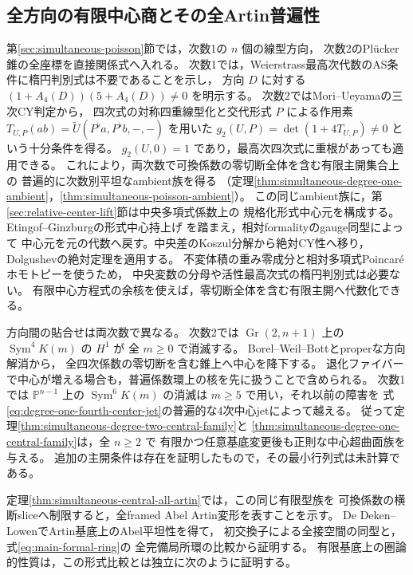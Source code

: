\documentclass[a4paper,11pt]{ltjsarticle}
\numberwithin{equation}{section}
\theoremstyle{plain}
\theoremstyle{definition}
\theoremstyle{remark}
\newcommand{\Gr}{\operatorname{Gr}}
\begin{document}
\subsection{全方向の有限中心商とその全Artin普遍性}
第\ref{sec:simultaneous-poisson}節では，次数1の $n$ 個の線型方向，
次数2のPl\"ucker錐の全座標を直接関係式へ入れる。
次数1では，Weierstrass最高次代数のAS条件に楕円判別式は不要であることを示し，
方向 $D$ に対する $(1+A_4(D))(5+A_4(D))\ne0$ を明示する。
次数2ではMori--Ueyama\cite[Theorem~3.4]{MoriUeyama2019}の三次CY判定から，
四次式の対称四重線型化と交代形式 $P$ による作用素
$T_{U,P}(ab)=\widetilde U(P^\flat a,P^\flat b,-,-)$ を用いた
$g_2(U,P)=\det(1+4T_{U,P})\ne0$ という十分条件を得る。
$g_2(U,0)=1$ であり，最高次四次式に重根があっても適用できる。
これにより，両次数で可換係数の零切断全体を含む有限主開集合上の
普遍的に次数別平坦なambient族を得る
（定理\ref{thm:simultaneous-degree-one-ambient}，\ref{thm:simultaneous-poisson-ambient}）。
この同じambient族に，第\ref{sec:relative-center-lift}節は中央多項式係数上の
規格化形式中心元を構成する。Etingof--Ginzburgの形式中心持上げ
\cite[Proposition~8.1.1(i)]{EG2010}を踏まえ，相対formalityのgauge同型によって
中心元を元の代数へ戻す。中央差のKoszul分解から絶対CY性へ移り，
Dolgushev\cite[Theorem~3, Proposition~1]{DolgushevModular2009}の絶対定理を適用する。
不変体積の重み零成分と相対多項式Poincar\'eホモトピーを使うため，
中央変数の分母や活性最高次式の楕円判別式は必要ない。
有限中心方程式の余核を使えば，零切断全体を含む有限主開へ代数化できる。

方向間の貼合せは両次数で異なる。
次数2では $\Gr(2,n+1)$ 上の $\operatorname{Sym}^4K(m)$ の $H^1$ が
全 $m\ge0$ で消滅する。
Borel--Weil--Bott\cite[Theorem~2.3]{GuoLuSharpe2017}とproperな方向解消から，
全四次係数の零切断を含む錐上へ中心を降下する。
退化ファイバーで中心が増える場合も，普遍係数環上の核を先に扱うことで含められる。
次数1では $\mathbb P^{n-1}$ 上の $\operatorname{Sym}^6K(m)$ の消滅は
$m\ge5$ で用い，それ以前の障害を
式\eqref{eq:degree-one-fourth-center-jet}の普遍的な4次中心jetによって越える。
従って定理\ref{thm:simultaneous-degree-two-central-family}と
\ref{thm:simultaneous-degree-one-central-family}は，全 $n\ge2$ で
有限かつ任意基底変更後も正則な中心超曲面族を与える。
追加の主開条件は存在を証明したもので，その最小行列式は未計算である。

定理\ref{thm:simultaneous-central-all-artin}では，この同じ有限型族を
可換係数の横断sliceへ制限すると，全framed Abel Artin変形を表すことを示す。
De Deken--Lowen\cite[Proposition~4.4]{DDL2011}でArtin基底上のAbel平坦性を得て，
初交換子による全接空間の同型と，式\eqref{eq:main-formal-ring}の
全完備局所環の比較から証明する。
有限基底上の圏論的性質は，この形式比較とは独立に次のように証明する。
\end{document}
